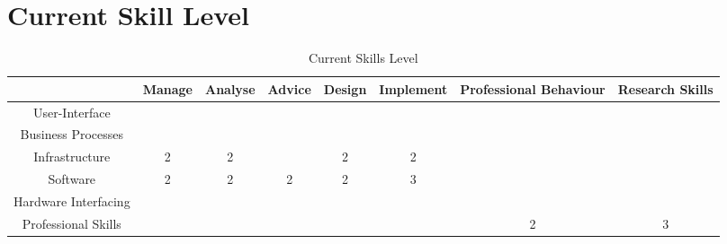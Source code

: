 
\section{Current Skill Level}
\label{sec:current}

\begin{table}[H]
	\centering
	\begin{tabular}{|c|c|c|c|c|c|c|c|}
		\hline
		& Manage & Analyse & Advice & Design & Implement & Professional Behaviour & Research Skills \\ \hline
		User-Interface & & & & & & & \\ \hline
		Business Processes & & & & & & & \\ \hline
		Infrastructure & 2 & 2 & & 2 & 2 & & \\ \hline
		Software & 2 & 2 & 2 & 2 & 3 & & \\ \hline
		Hardware Interfacing & & & & & & & \\ \hline
		Professional Skills & & & & & & 2 & 3 \\ \hline
	\end{tabular}
	\caption{Current Skills Level}
	\label{currentskills}
\end{table}